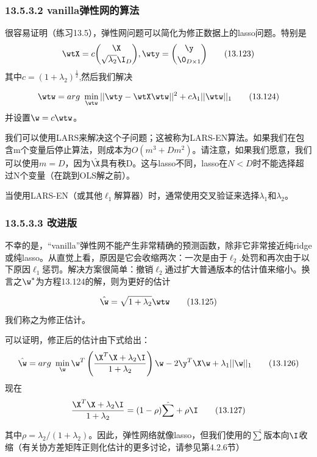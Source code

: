 \documentclass[a4paper]{article}
\begin{document}
\subsubsection*{13.5.3.2 vanilla弹性网的算法}
很容易证明（练习13.5），弹性网问题可以简化为修正数据上的lasso问题。特别是
\begin{equation}
	\wtX=c\binom{\X}{\sqrt{\lambda_2}\I_D},\wty=\binom{\y}{\0_{D\times 1}}\tag{13.123}
\end{equation}
其中$c=(1+\lambda_2)^{\frac{1}{2}}$,然后我们解决

\begin{equation}
	\wtw=arg\ \min_{\wtw}||\wty-\wtX\wtw||^2+c\lambda_1||\wtw||_1\tag{13.124}
\end{equation}
并设置$\w=c\wtw$。

我们可以使用LARS来解决这个子问题；这被称为LARS-EN算法。如果我们在包含m个变量后停止算法，则成本为$O(m^3+Dm^2)$。请注意，如果我们愿意，我们可以使用$m=D$，因为$\hat{\X}$具有秩D。这与lasso不同，lasso在$N<D$时不能选择超过N个变量（在跳到OLS解之前）。

当使用LARS-EN（或其他$\ell_1$解算器）时，通常使用交叉验证来选择$\lambda_1$和$\lambda_2$。

\subsubsection*{13.5.3.3 改进版}
不幸的是，“vanilla”弹性网不能产生非常精确的预测函数，除非它非常接近纯ridge或纯lasso。从直觉上看，原因是它会收缩两次：一次是由于$\ell_2$.处罚和再次由于以下原因$\ell_1$惩罚。解决方案很简单：撤销$\ell_2$通过扩大普通版本的估计值来缩小。换言之$\w^*$为方程13.124的解，则为更好的估计

\begin{equation}
	\hat{\w}=\sqrt{1+\lambda_2}\wtw\tag{13.125}
\end{equation}
我们称之为修正估计。

可以证明，修正后的估计由下式给出：
\begin{equation}
	\hat{\w}=arg\ \min_\w\w^T\left(\frac{\X^T\X+\lambda_2\I}{1+\lambda_2}\right)\w-2\y^T\X\w+\lambda_1||\w||_1\tag{13.126}
\end{equation}
现在
\begin{equation}
	\frac{\X^T\X+\lambda_2\I}{1+\lambda_2}=(1-\rho)\hat{\sum}+\rho\I\tag{13.127}
\end{equation}

其中$\rho=\lambda_2/(1+\lambda_2)$。因此，弹性网络就像lasso，但我们使用的$\hat{\sum}$版本向$\I$收缩（有关协方差矩阵正则化估计的更多讨论，请参见第4.2.6节）
\end{document}
